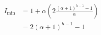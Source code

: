 \documentclass{beamer}
\begin{document}
\begin{frame}
\begin{columns}
\begin{column}{\textlecolumn}
            \vspace{-0.5cm}
            \begin{block}{}
                \[
                    \begin{aligned}
                        I_{\text{min}} &= 1 + \alpha\left(2\frac{\left(\alpha + 1\right)^{h - 1} - 1}{\alpha}\right) \\
                        &= 2\left(\alpha + 1\right)^{h - 1} - 1
                    \end{aligned}
                \]
            \end{block}
        \end{column}
        \begin{column}{\textricolumn}
        \end{column}
    \end{columns}

    \framebreak


\end{frame}
\end{document}
